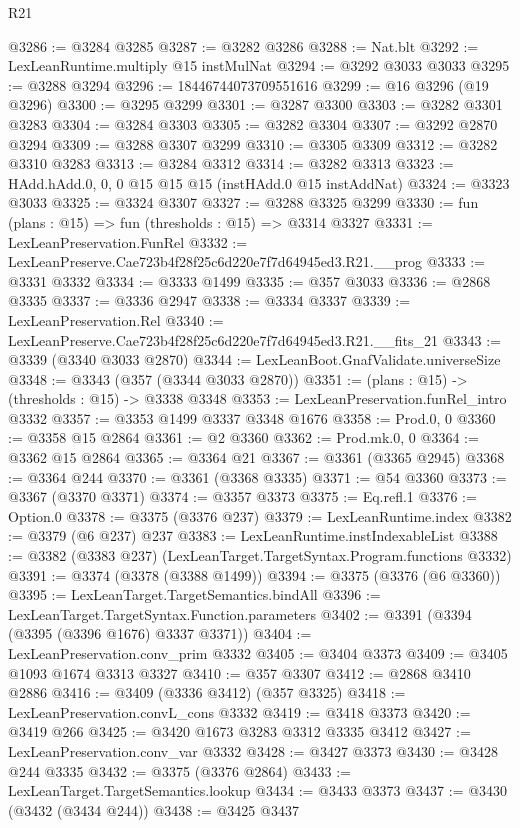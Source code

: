 \begin{lexlean}{R21}
\begin{coremodule}
{{{{{{{{{{{{{{{{{{{@3286 := @3284 @3285
@3287 := @3282 @3286
@3288 := Nat.blt
@3292 := LexLeanRuntime.multiply @15 instMulNat
@3294 := @3292 @3033 @3033
@3295 := @3288 @3294
@3296 := 18446744073709551616
@3299 := @16 @3296 (@19 @3296)
@3300 := @3295 @3299
@3301 := @3287 @3300
@3303 := @3282 @3301 @3283
@3304 := @3284 @3303
@3305 := @3282 @3304
@3307 := @3292 @2870 @3294
@3309 := @3288 @3307 @3299
@3310 := @3305 @3309
@3312 := @3282 @3310 @3283
@3313 := @3284 @3312
@3314 := @3282 @3313
@3323 := HAdd.hAdd.{0, 0, 0} @15 @15 @15 (instHAdd.{0} @15 instAddNat)
@3324 := @3323 @3033
@3325 := @3324 @3307
@3327 := @3288 @3325 @3299
@3330 := fun (plans : @15) => fun (thresholds : @15) => @3314 @3327
@3331 := LexLeanPreservation.FunRel
@3332 := LexLeanPreserve.Cae723b4f28f25c6d220e7f7d64945ed3.R21.__prog
@3333 := @3331 @3332
@3334 := @3333 @1499
@3335 := @357 @3033
@3336 := @2868 @3335
@3337 := @3336 @2947
@3338 := @3334 @3337
@3339 := LexLeanPreservation.Rel
@3340 := LexLeanPreserve.Cae723b4f28f25c6d220e7f7d64945ed3.R21.__fits_21
@3343 := @3339 (@3340 @3033 @2870)
@3344 := LexLeanBoot.GnafValidate.universeSize
@3348 := @3343 (@357 (@3344 @3033 @2870))
@3351 := (plans : @15) -> (thresholds : @15) -> @3338 @3348
@3353 := LexLeanPreservation.funRel_intro @3332
@3357 := @3353 @1499 @3337 @3348 @1676
@3358 := Prod.{0, 0}
@3360 := @3358 @15 @2864
@3361 := @2 @3360
@3362 := Prod.mk.{0, 0}
@3364 := @3362 @15 @2864
@3365 := @3364 @21
@3367 := @3361 (@3365 @2945)
@3368 := @3364 @244
@3370 := @3361 (@3368 @3335)
@3371 := @54 @3360
@3373 := @3367 (@3370 @3371)
@3374 := @3357 @3373
@3375 := Eq.refl.{1}
@3376 := Option.{0}
@3378 := @3375 (@3376 @237)
@3379 := LexLeanRuntime.index
@3382 := @3379 (@6 @237) @237
@3383 := LexLeanRuntime.instIndexableList
@3388 := @3382 (@3383 @237) (LexLeanTarget.TargetSyntax.Program.functions @3332)
@3391 := @3374 (@3378 (@3388 @1499))
@3394 := @3375 (@3376 (@6 @3360))
@3395 := LexLeanTarget.TargetSemantics.bindAll
@3396 := LexLeanTarget.TargetSyntax.Function.parameters
@3402 := @3391 (@3394 (@3395 (@3396 @1676) @3337 @3371))
@3404 := LexLeanPreservation.conv_prim @3332
@3405 := @3404 @3373
@3409 := @3405 @1093 @1674 @3313 @3327
@3410 := @357 @3307
@3412 := @2868 @3410 @2886
@3416 := @3409 (@3336 @3412) (@357 @3325)
@3418 := LexLeanPreservation.convL_cons @3332
@3419 := @3418 @3373
@3420 := @3419 @266
@3425 := @3420 @1673 @3283 @3312 @3335 @3412
@3427 := LexLeanPreservation.conv_var @3332
@3428 := @3427 @3373
@3430 := @3428 @244 @3335
@3432 := @3375 (@3376 @2864)
@3433 := LexLeanTarget.TargetSemantics.lookup
@3434 := @3433 @3373
@3437 := @3430 (@3432 (@3434 @244))
@3438 := @3425 @3437
}}}}}}}}}}}}}}}}}}}
\end{coremodule}
\end{lexlean}
